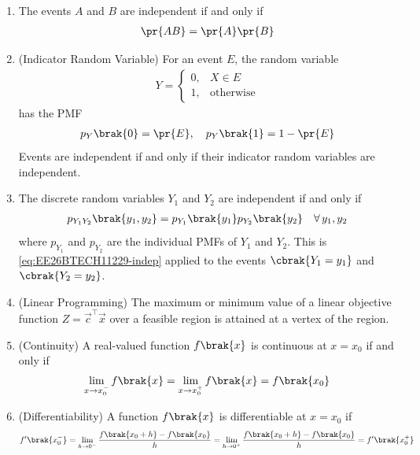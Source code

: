 \begin{enumerate}[label=\thesubsection.\arabic*, ref=\thesubsection.\theenumi]
\begin{align}
	\pr{E} = \sum_{n \in E}p_X\brak{n}
	\label{eq:EE26BTECH11229-event-pmf}
\end{align}
\item The events $A$ and $B$ are independent if and only if
\begin{align}
	\pr{AB} = \pr{A}\pr{B}
	\label{eq:EE26BTECH11229-indep}
\end{align}
\item (Indicator Random Variable) For an event $E$, the random variable
\begin{align}
	Y = \begin{cases}
		0, & X \in E
		\\
		1, & \text{otherwise}
	\end{cases}
	\label{eq:EE26BTECH11229-indicator}
\end{align}
has the PMF
\begin{align}
	p_Y\brak{0} = \pr{E}, \quad p_Y\brak{1} = 1 - \pr{E}
\end{align}
Events are independent if and only if their indicator random variables are independent.
\item The discrete random variables $Y_1$ and $Y_2$ are independent if and only if
\begin{align}
	p_{Y_1Y_2}\brak{y_1, y_2} = p_{Y_1}\brak{y_1}p_{Y_2}\brak{y_2} \quad \forall\, y_1, y_2
	\label{eq:EE26BTECH11229-indep-rv}
\end{align}
where $p_{Y_1}$ and $p_{Y_2}$ are the individual PMFs of $Y_1$ and $Y_2$. This is \eqref{eq:EE26BTECH11229-indep} applied to the events $\cbrak{Y_1 = y_1}$ and $\cbrak{Y_2 = y_2}$.
\item (Linear Programming) The maximum or minimum value of a linear objective function $Z = \vec{c}^{\top}\vec{x}$ over a feasible region is attained at a vertex of the region.
\label{eq:EE26BTECH11229-lpp-vertex}
\item (Continuity) A real-valued function $f\brak{x}$ is continuous at $x = x_0$ if and only if
\begin{align}
	\lim_{x \to x_0^-}f\brak{x} = \lim_{x \to x_0^+}f\brak{x} = f\brak{x_0}
	\label{eq:EE26BTECH11229-continuity}
\end{align}
\item (Differentiability) A function $f\brak{x}$ is differentiable at $x = x_0$ if
\begin{align}
	f^{\prime}\brak{x_0^-} = \lim_{h \to 0^-}\frac{f\brak{x_0 + h} - f\brak{x_0}}{h}
	= \lim_{h \to 0^+}\frac{f\brak{x_0 + h} - f\brak{x_0}}{h} = f^{\prime}\brak{x_0^+}
	\label{eq:EE26BTECH11229-diff-def}

\end{align}
\end{enumerate}
